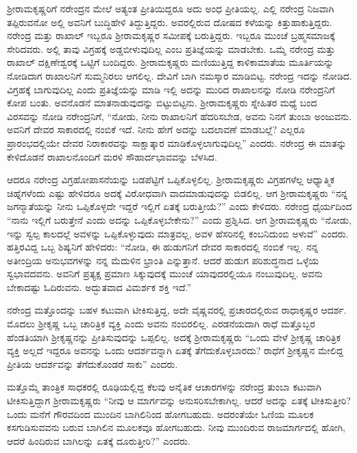 ಶ‍್ರೀರಾಮಕೃಷ್ಣರಿಗೆ ನರೇಂದ್ರನ ಮೇಲೆ ಅತ್ಯಂತ ಪ್ರೀತಿಯಿದ್ದರೂ ಅದು ಅಂಧ ಪ್ರೀತಿಯಲ್ಲ. ಎಲ್ಲಿ ನರೇಂದ್ರ ನಿಜವಾಗಿ ತಪ್ಪಿರುವನೋ ಅಲ್ಲಿ ಅವನಿಗೆ ಬುದ್ಧಿಹೇಳಿ ತಿದ್ದುತ್ತಿದ್ದರು. ಅವರಲ್ಲಿರುವ ದೋಷದ ಕಳೆಯನ್ನು ಕಿತ್ತುಹಾಕುತ್ತಿದ್ದರು. ನರೇಂದ್ರ ಮತ್ತು ರಾಖಾಲ್ ಇಬ್ಬರೂ ಶ‍್ರೀರಾಮಕೃಷ್ಣರ ಸಮೀಪಕ್ಕೆ ಬರುತ್ತಿದ್ದರು. ಇಬ್ಬರೂ ಮುಂಚೆ ಬ್ರಹ್ಮಸಮಾಜಕ್ಕೆ ಸೇರಿದವರು. ಅಲ್ಲಿ ತಾವು ವಿಗ್ರಹಕ್ಕೆ ಅಡ್ಡಬೀಳುವುದಿಲ್ಲ ಎಂಬ ಪ್ರತಿಜ್ಞೆಯನ್ನು ಮಾಡಬೇಕು. ಒಮ್ಮೆ ನರೇಂದ್ರ ಮತ್ತು ರಾಖಾಲ್ ದಕ್ಷಿಣೇಶ್ವರಕ್ಕೆ ಒಟ್ಟಿಗೆ ಬಂದಿದ್ದರು. ಶ‍್ರೀರಾಮಕೃಷ್ಣರು ಮಣಿಯುತ್ತಿದ್ದ ಕಾಳಿಕಾಮಾತೆಯ ಮೂರ್ತಿಯನ್ನು ನೋಡಿದಾಗ ರಾಖಾಲನಿಗೆ ಸುಮ್ಮನಿರಲು ಆಗಲಿಲ್ಲ. ದೇವಿಗೆ ಬಾಗಿ ನಮಸ್ಕಾರ ಮಾಡಿಬಿಟ್ಟ. ನರೇಂದ್ರ ಇದನ್ನು ನೋಡಿದ. ವಿಗ್ರಹಕ್ಕೆ ಬಾಗುವುದಿಲ್ಲ ಎಂದು ಪ್ರತಿಜ್ಞೆಯನ್ನು ಮಾಡಿ ಇಲ್ಲಿ ಅದನ್ನು ಮುರಿದ ರಾಖಾಲನನ್ನು ನೋಡಿ ನರೇಂದ್ರನಿಗೆ ಕೋಪ ಬಂತು. ಅವನೊಡನೆ ಮಾತನಾಡುವುದನ್ನು ಬಿಟ್ಟುಬಿಟ್ಟನು. ಶ‍್ರೀರಾಮಕೃಷ್ಣರು ಸ್ನೇಹಿತರ ಮಧ್ಯೆ ಬಂದ ವಿರಸವನ್ನು ನೋಡಿ ನರೇಂದ್ರನಿಗೆ, “ನೋಡು, ನೀನು ರಾಖಾಲನಿಗೆ ಹೆದರಿಸಬೇಡ, ಅವನು ನಿನಗೆ ತುಂಬಾ ಅಂಜುವನು. ಅವನಿಗೆ ದೇವರ ಸಾಕಾರದಲ್ಲಿ ನಂಬಿಕೆ ಇದೆ. ನೀನು ಹೇಗೆ ಅದನ್ನು ಬದಲಾವಣೆ ಮಾಡಬಲ್ಲೆ? ಎಲ್ಲರೂ ಪ್ರಾರಂಭದಲ್ಲಿಯೇ ದೇವರ ನಿರಾಕಾರವನ್ನು ಸಾಕ್ಷಾತ್ಕಾರ ಮಾಡಿಕೊಳ್ಳಲಾಗುವುದಿಲ್ಲ” ಎಂದರು. ನರೇಂದ್ರ ಈ ಮಾತನ್ನು ಕೇಳಿದೊಡನೆ ರಾಖಾಲನೊಂದಿಗೆ ಮರಳಿ ಸೌಹಾರ್ದಭಾವವನ್ನು ಬೆಳಸಿದ.

ಆದರೂ ನರೇಂದ್ರ ವಿಗ್ರಹೋಪಾಸನೆಯನ್ನು ಬಡಪೆಟ್ಟಿಗೆ ಒಪ್ಪಿಕೊಳ್ಳಲಿಲ್ಲ. ಶ‍್ರೀರಾಮಕೃಷ್ಣರು ವಿಗ್ರಹಗಳೆಲ್ಲ ಆಧ್ಯಾತ್ಮಿಕ ಚಿಹ್ನೆಗಳೆಂದು ಎಷ್ಟು ಹೇಳಿದರೂ ಅದಕ್ಕೆ ವಿರೋಧವಾಗಿ ವಾದಮಾಡುವುದನ್ನು ಬಿಡಲಿಲ್ಲ. ಆಗ ಶ‍್ರೀರಾಮಕೃಷ್ಣರು “ನನ್ನ ಜಗನ್ಮಾತೆಯನ್ನು ನೀನು ಒಪ್ಪಿಕೊಳ್ಳದೇ ಇದ್ದರೆ ಇಲ್ಲಿಗೆ ಏತಕ್ಕೆ ಬರುತ್ತೀಯೆ?” ಎಂದು ಕೇಳಿದರು. ನರೇಂದ್ರ ಧೈರ್ಯದಿಂದ “ನಾನು ಇಲ್ಲಿಗೆ ಬರುತ್ತೇನೆ ಎಂದು ಅದನ್ನು ಒಪ್ಪಿಕೊಳ್ಳಬೇಕೇನು?” ಎಂದು ಪ್ರಶ್ನಿಸಿದ. ಆಗ ಶ‍್ರೀರಾಮಕೃಷ್ಣರು “ನೋಡು, ಇನ್ನು ಸ್ವಲ್ಪ ಕಾಲದಲ್ಲೆ ಅವಳನ್ನು ಒಪ್ಪಿಕೊಳ್ಳುವುದು ಮಾತ್ರವಲ್ಲ, ಅವಳ ಹೆಸರಿನಲ್ಲಿ ಕಂಬನಿದುಂಬಿ ಅಳುವೆ” ಎಂದರು. ಹತ್ತಿರವಿದ್ದ ಒಬ್ಬ ಶಿಷ್ಯನಿಗೆ ಹೇಳಿದರು: “ನೋಡಿ, ಈ ಹುಡುಗನಿಗೆ ದೇವರ ಸಾಕಾರದಲ್ಲಿ ನಂಬಿಕೆ ಇಲ್ಲ. ನನ್ನ ಅತೀಂದ್ರಿಯ ಅನುಭವಗಳನ್ನು ನನ್ನ ಮೆದುಳಿನ ಭ್ರಾಂತಿ ಎನ್ನುತ್ತಾನೆ. ಆದರೆ ಹುಡುಗ ಪರಿಶುದ್ಧನಾದ ಒಳ್ಳೆಯ ಸ್ವಭಾವದವನು. ಅವನಿಗೆ ಪ್ರತ್ಯಕ್ಷ ಪ್ರಮಾಣ ಸಿಕ್ಕುವುದಕ್ಕೆ ಮುಂಚೆ ಯಾವುದರಲ್ಲಿಯೂ ನಂಬುವುದಿಲ್ಲ. ಅವನು ಬೇಕಾದಷ್ಟು ಓದಿರುವನು. ಅದ್ಭುತವಾದ ವಿಮರ್ಶಕ ಶಕ್ತಿ ಇದೆ.”

ನರೇಂದ್ರ ಮತ್ತೊಂದನ್ನು ಬಹಳ ಕಟುವಾಗಿ ಟೀಕಿಸುತ್ತಿದ್ದ, ಅದೇ ವೈಷ್ಣವರಲ್ಲಿ ಪ್ರಚಾರದಲ್ಲಿರುವ ರಾಧಾಕೃಷ್ಣರ ಆದರ್ಶ. ಮೊದಲು ಶ‍್ರೀಕೃಷ್ಣ ಒಬ್ಬ ಚಾರಿತ್ರಿಕ ವ್ಯಕ್ತಿ ಎಂದು ಅವನು ನಂಬಿರಲಿಲ್ಲ. ಎರಡನೆಯದಾಗಿ ರಾಧೆ ಮತ್ತೊಬ್ಬರ ಹೆಂಡತಿಯಾಗಿ ಶ‍್ರೀಕೃಷ್ಣನನ್ನು ಪ್ರೀತಿಸುವುದನ್ನು ಒಪ್ಪಲಿಲ್ಲ. ಅದಕ್ಕೆ ಶ‍್ರೀರಾಮಕೃಷ್ಣರು “ಒಂದು ವೇಳೆ ಶ‍್ರೀಕೃಷ್ಣ ಚಾರಿತ್ರಿಕ ವ್ಯಕ್ತಿ ಅಲ್ಲದೆ ಇದ್ದರೂ ಅವನನ್ನು ಒಂದು ಆದರ್ಶವನ್ನಾಗಿ ಏತಕ್ಕೆ ತೆಗೆದುಕೊಳ್ಳಬಾರದು? ರಾಧೆಗೆ ಶ‍್ರೀಕೃಷ್ಣನ ಮೇಲಿದ್ದ ಪ್ರೀತಿಯ ಆದರ್ಶವನ್ನು ತೆಗೆದುಕೊಂಡರೆ ಸಾಕು” ಎಂದರು.

ಮತ್ತೊಮ್ಮೆ ತಾಂತ್ರಿಕ ಸಾಧಕರಲ್ಲಿ ರೂಢಿಯಲ್ಲಿದ್ದ ಕೆಲವು ಅನೈತಿಕ ಆಚಾರಗಳನ್ನು ನರೇಂದ್ರ ತುಂಬಾ ಕಟುವಾಗಿ ಟೀಕಿಸುತ್ತಿದ್ದಾಗ ಶ‍್ರೀರಾಮಕೃಷ್ಣರು “ನೀವು ಆ ಮಾರ್ಗವನ್ನು ಅನುಸರಿಸಬೇಕಾಗಿಲ್ಲ. ಆದರೆ ಅದನ್ನು ಏತಕ್ಕೆ ಟೀಕಿಸುತ್ತೀರಿ? ಒಂದು ಮನೆಗೆ ಗೌರವದಿಂದ ಮುಂದಿನ ಬಾಗಿಲಿನಿಂದ ಹೋಗಬಹುದು. ಅದರಂತೆಯೇ ಓಣಿಯ ಮೂಲಕ ಕಸಗುಡಿಸುವವನು ಬರುವ ಬಾಗಿಲಿನ ಮೂಲಕವೂ ಹೋಗಬಹುದು. ನೀವು ಮುಂದಿರುವ ರಾಜಮಾರ್ಗದಲ್ಲಿ ಹೋಗಿ, ಆದರೆ ಹಿಂದಿರುವ ಬಾಗಿಲನ್ನು ಏತಕ್ಕೆ ದೂರುತ್ತೀರಿ?” ಎಂದರು.

